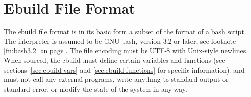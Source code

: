 \chapter{Ebuild File Format}
\label{sec:ebuild-format}

The ebuild file format is in its basic form a subset of the format of a bash script. The interpreter
is assumed to be GNU bash, version 3.2 or later, see footnote \ref{fn:bash3.2} on page
\pageref{fn:bash3.2}.  The file encoding must be UTF-8 with Unix-style newlines. When sourced, the
ebuild must define certain variables and functions (see sections~\ref{sec:ebuild-vars} and
\ref{sec:ebuild-functions} for specific information), and must not call any external programs, write
anything to standard output or standard error, or modify the state of the system in any way.


